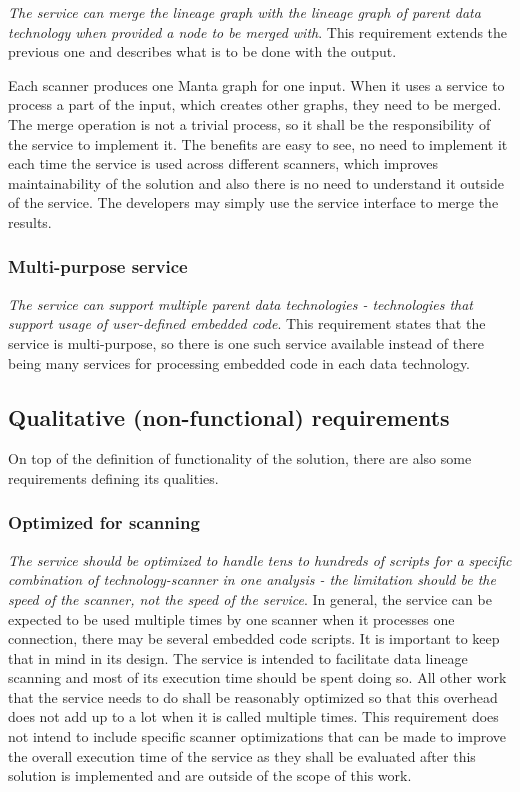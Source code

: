 \textit{The service can merge the lineage graph with the lineage graph of parent data technology when provided a node to be merged with}. This requirement extends the previous one and describes what is to be done with the output.
\par
Each scanner produces one Manta graph for one input. When it uses a service to process a part of the input, which creates other graphs, they need to be merged. The merge operation is not a trivial process, so it shall be the responsibility of the service to implement it. The benefits are easy to see, no need to implement it each time the service is used across different scanners, which improves maintainability of the solution and also there is no need to understand it outside of the service. The developers may simply use the service interface to merge the results.

\subsubsection{Multi-purpose service}

\textit{The service can support multiple parent data technologies - technologies that support usage of user-defined embedded code}. This requirement states that the service is multi-purpose, so there is one such service available instead of there being many services for processing embedded code in each data technology.

\subsection{Qualitative (non-functional) requirements}

On top of the definition of functionality of the solution, there are also some requirements defining its qualities.

\subsubsection{Optimized for scanning}

\textit{The service should be optimized to handle tens to hundreds of scripts for a specific combination of technology-scanner in one analysis - the limitation should be the speed of the scanner, not the speed of the service}. In general, the service can be expected to be used multiple times by one scanner when it processes one connection, there may be several embedded code scripts. It is important to keep that in mind in its design. The service is intended to facilitate data lineage scanning and most of its execution time should be spent doing so. All other work that the service needs to do shall be reasonably optimized so that this overhead does not add up to a lot when it is called multiple times. This requirement does not intend to include specific scanner optimizations that can be made to improve the overall execution time of the service as they shall be evaluated after this solution is implemented and are outside of the scope of this work.


